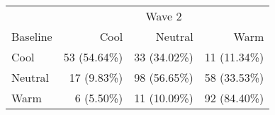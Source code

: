 \begin{table}[!t]
\fontsize{12.0pt}{14.4pt}\selectfont
\begin{tabular*}{\linewidth}{@{\extracolsep{\fill}}lrrr}
\toprule
 & \multicolumn{3}{c}{Wave 2} \\ 
\cmidrule(lr){2-4}
Baseline & Cool & Neutral & Warm \\ 
\midrule\addlinespace[2.5pt]
Cool & 53 (54.64\%) & 33 (34.02\%) & 11 (11.34\%) \\ 
Neutral & 17 (9.83\%) & 98 (56.65\%) & 58 (33.53\%) \\ 
Warm & 6 (5.50\%) & 11 (10.09\%) & 92 (84.40\%) \\ 
\bottomrule
\end{tabular*}
\end{table}

